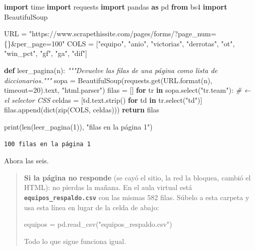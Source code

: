 \documentclass[
]{article}
\newenvironment{Shaded}{}{}
\newcommand{\BuiltInTok}[1]{\textcolor[rgb]{0.00,0.50,0.00}{#1}}
\newcommand{\CommentTok}[1]{\textcolor[rgb]{0.38,0.63,0.69}{\textit{#1}}}
\newcommand{\ControlFlowTok}[1]{\textcolor[rgb]{0.00,0.44,0.13}{\textbf{#1}}}
\newcommand{\DecValTok}[1]{\textcolor[rgb]{0.25,0.63,0.44}{#1}}
\newcommand{\ImportTok}[1]{\textcolor[rgb]{0.00,0.50,0.00}{\textbf{#1}}}
\newcommand{\KeywordTok}[1]{\textcolor[rgb]{0.00,0.44,0.13}{\textbf{#1}}}
\newcommand{\NormalTok}[1]{#1}
\newcommand{\OperatorTok}[1]{\textcolor[rgb]{0.40,0.40,0.40}{#1}}
\newcommand{\SpecialCharTok}[1]{\textcolor[rgb]{0.25,0.44,0.63}{#1}}
\newcommand{\StringTok}[1]{\textcolor[rgb]{0.25,0.44,0.63}{#1}}
\begin{document}
\protect{}\label{17fefd72}
\begin{Shaded}
\begin{Highlighting}[]
\ImportTok{import}\NormalTok{ time}
\ImportTok{import}\NormalTok{ requests}
\ImportTok{import}\NormalTok{ pandas }\ImportTok{as}\NormalTok{ pd}
\ImportTok{from}\NormalTok{ bs4 }\ImportTok{import}\NormalTok{ BeautifulSoup}

\NormalTok{URL }\OperatorTok{=} \StringTok{"https://www.scrapethissite.com/pages/forms/?page\_num=}\SpecialCharTok{\{\}}\StringTok{\&per\_page=100"}
\NormalTok{COLS }\OperatorTok{=}\NormalTok{ [}\StringTok{"equipo"}\NormalTok{, }\StringTok{"anio"}\NormalTok{, }\StringTok{"victorias"}\NormalTok{, }\StringTok{"derrotas"}\NormalTok{, }\StringTok{"ot"}\NormalTok{, }\StringTok{"win\_pct"}\NormalTok{,}
        \StringTok{"gf"}\NormalTok{, }\StringTok{"ga"}\NormalTok{, }\StringTok{"dif"}\NormalTok{]}

\KeywordTok{def}\NormalTok{ leer\_pagina(n):}
    \CommentTok{"""Devuelve las filas de una página como lista de diccionarios."""}
\NormalTok{    sopa }\OperatorTok{=}\NormalTok{ BeautifulSoup(requests.get(URL.}\BuiltInTok{format}\NormalTok{(n), timeout}\OperatorTok{=}\DecValTok{20}\NormalTok{).text,}
                         \StringTok{"html.parser"}\NormalTok{)}
\NormalTok{    filas }\OperatorTok{=}\NormalTok{ []}
    \ControlFlowTok{for}\NormalTok{ tr }\KeywordTok{in}\NormalTok{ sopa.select(}\StringTok{"tr.team"}\NormalTok{):                 }\CommentTok{\# ← el selector CSS}
\NormalTok{        celdas }\OperatorTok{=}\NormalTok{ [td.text.strip() }\ControlFlowTok{for}\NormalTok{ td }\KeywordTok{in}\NormalTok{ tr.select(}\StringTok{"td"}\NormalTok{)]}
\NormalTok{        filas.append(}\BuiltInTok{dict}\NormalTok{(}\BuiltInTok{zip}\NormalTok{(COLS, celdas)))}
    \ControlFlowTok{return}\NormalTok{ filas}

\BuiltInTok{print}\NormalTok{(}\BuiltInTok{len}\NormalTok{(leer\_pagina(}\DecValTok{1}\NormalTok{)), }\StringTok{"filas en la página 1"}\NormalTok{)}
\end{Highlighting}
\end{Shaded}

\begin{verbatim}
100 filas en la página 1
\end{verbatim}

\protect{}\label{ac26ed8f}
Ahora las seis.

\begin{quote}
\textbf{Si la página no responde} (se cayó el sitio, la red la bloquea,
cambió el HTML): no pierdas la mañana. En el aula virtual está
\textbf{\texttt{equipos\_respaldo.csv}} con las mismas 582 filas. Súbelo
a esta carpeta y usa esta línea en lugar de la celda de abajo:

\begin{Shaded}
\begin{Highlighting}[]
\NormalTok{equipos }\OperatorTok{=}\NormalTok{ pd.read\_csv(}\StringTok{"equipos\_respaldo.csv"}\NormalTok{)}
\end{Highlighting}
\end{Shaded}

Todo lo que sigue funciona igual.
\end{quote}
\end{document}
